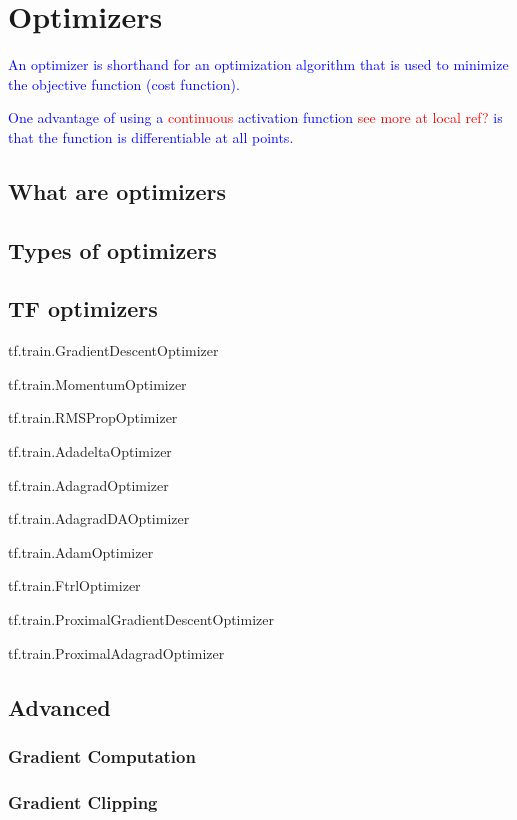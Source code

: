 \section{Optimizers}

\textcolor{blue}{An optimizer is shorthand for an optimization algorithm that is used to minimize the objective function (cost function).}
	
\textcolor{blue}{One advantage of using a \textcolor{red}{continuous} activation function \textcolor{red}{see more at local ref?} is that the function is differentiable at all points. }

\subsection{What are optimizers}

\subsection{Types of optimizers}

\subsection{TF optimizers}

tf.train.GradientDescentOptimizer

tf.train.MomentumOptimizer

tf.train.RMSPropOptimizer

tf.train.AdadeltaOptimizer

tf.train.AdagradOptimizer

tf.train.AdagradDAOptimizer

tf.train.AdamOptimizer

tf.train.FtrlOptimizer

tf.train.ProximalGradientDescentOptimizer

tf.train.ProximalAdagradOptimizer

\subsection{Advanced}

\subsubsection{Gradient Computation}

\subsubsection{Gradient Clipping}